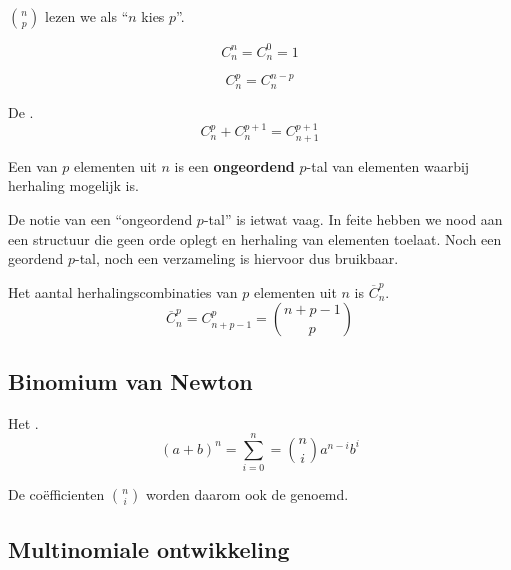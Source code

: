 \documentclass[main.tex]{subfiles}
\begin{document}
\begin{opm}
  $\binom{n}{p}$ lezen we als ``$n$ kies $p$''.
\end{opm}

\begin{ei}
  \[ C_{n}^{n} = C_{n}^{0} = 1 \]
\end{ei}

\begin{ei}
  \[ C_{n}^{p} = C_{n}^{n-p} \]
\end{ei}

\begin{ei}
  De .
  \[ C_{n}^{p} + C_{n}^{p+1} = C_{n+1}^{p+1} \]
\end{ei}

\begin{de}
  Een  van $p$ elementen uit $n$ is een \textbf{ongeordend} $p$-tal van elementen waarbij herhaling mogelijk is.
\end{de}

\begin{opm}
  De notie van een ``ongeordend $p$-tal'' is ietwat vaag.
  In feite hebben we nood aan een structuur die geen orde oplegt en herhaling van elementen toelaat.
  Noch een geordend $p$-tal, noch een verzameling is hiervoor dus bruikbaar.
\end{opm}

\begin{st}
  Het aantal herhalingscombinaties van $p$ elementen uit $n$ is $\overline{C}_{n}^{p}$.
  \[ \overline{C}_{n}^{p} = C_{n+p-1}^{p} = \binom{n+p-1}{p} \]
\end{st}

\subsection{Binomium van Newton}
\label{sec:binomium-van-newton}

\begin{st}
  Het .
  \[ (a+b)^{n} = \sum_{i=0}^{n} = \binom{n}{i} a^{n-i}b^{i} \]
\end{st}

\begin{de}
  De co\"efficienten $\binom{n}{i}$ worden daarom ook de  genoemd.
\end{de}

\subsection{Multinomiale ontwikkeling}
\label{sec:mult-ontw}
\end{document}
